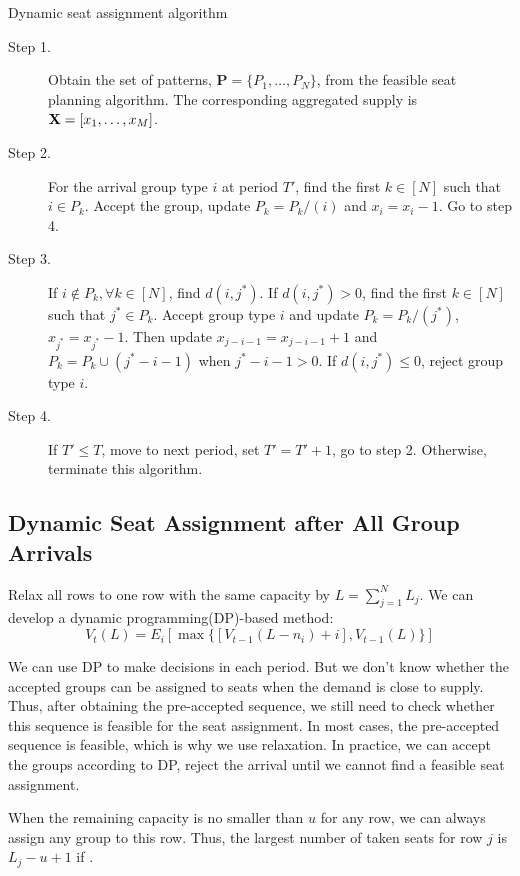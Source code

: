 \begin{algorithm}[H]
  \caption{Dynamic seat assignment algorithm}\label{algo_nested_policy}
  \begin{description}
    \item[Step 1.] Obtain the set of patterns, $\mathbf{P} = \{P_1,\ldots,P_{N}\}$, from the feasible seat planning algorithm. The corresponding aggregated supply is $\mathbf{X} = [x_{1}, \ldots, x_{M}]$.
    \item[Step 2.] For the arrival group type $i$ at period $T{'}$, find the first $k \in [N]$ such that $i \in P_k$. Accept the group, update $P_{k} = P_{k}/(i)$ and $x_{i} = x_{i} -1$. Go to step 4.
    \item[Step 3.] If $i \notin P_k, \forall k \in [N]$, find $d(i,j^{*})$. If $d(i,j^{*})>0$, find the first $k \in [N]$ such that $j^{*} \in P_k$. Accept group type $i$ and update $P_{k} = P_{k}/(j^{*})$, $x_{j^{*}} = x_{j^{*}} -1$. Then update $x_{j-i-1} = x_{j-i-1} + 1$ and $P_{k}= P_{k} \cup (j^{*}-i-1)$ when $j^{*}-i-1 > 0$. If $d(i,j^{*}) \leq 0$, reject group type $i$.
    \item[Step 4.] If $T{'} \leq T$, move to next period, set $T{'} = T{'}+1$, go to step 2. Otherwise, terminate this algorithm.
  \end{description}
\end{algorithm}

\subsection{Dynamic Seat Assignment after All Group Arrivals}
Relax all rows to one row with the same capacity by $L = \sum_{j=1}^{N} L_j$. We can develop a dynamic programming(DP)-based method:
$$V_{t}(L) = E_{i} [\max\{ {[V_{t-1}(L-n_i)+ i]}, {V_{t-1}(L)}\}]$$


We can use DP to make decisions in each period. But we don't know whether the accepted groups can be assigned to seats when the demand is close to supply. Thus, after obtaining the pre-accepted sequence, we still need to check whether this sequence is feasible for the seat assignment. In most cases, the pre-accepted sequence is feasible, which is why we use relaxation. In practice, we can accept the groups according to DP, reject the arrival until we cannot find a feasible seat assignment.

When the remaining capacity is no smaller than $u$ for any row, we can always assign any group to this row. Thus, the largest number of taken seats for row $j$ is $L_j -u +1$ if . 

